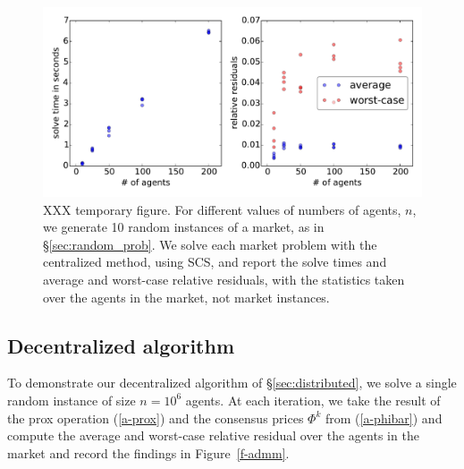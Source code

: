 \documentclass[12pt]{article}
\begin{document}
\begin{figure}
\begin{center}
\includegraphics[width=1.0\textwidth]{figures/cvxpy}
\end{center}
\caption{XXX temporary figure. For different values of numbers of agents, $n$,
we generate 10 random instances of a market, as in \S\ref{sec:random_prob}.
We solve each market problem with the centralized method, using SCS, and
report the solve times and average and worst-case relative residuals, with the
statistics taken over the agents in the market, not market instances.}
\label{f-cvxpy}
\end{figure}


\subsection{Decentralized algorithm}

To demonstrate our decentralized algorithm of \S\ref{sec:distributed},
we solve a single random instance of size $n=10^6$ agents. At each iteration,
we take the result of the prox operation (\ref{a-prox}) and the consensus
prices $\Phi^k$ from (\ref{a-phibar}) and compute the average and worst-case
relative residual over the agents in the market and record the findings in
Figure~\ref{f-admm}.
\end{document}
